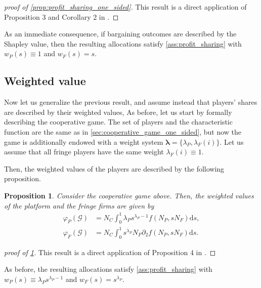 \documentclass[a4paper]{article}
\newtheorem{proposition}{Proposition}
\newcommand{\ds}{\mathrm{d}s}
\begin{document}
\begin{proof}[proof of \cref{prop:profit_sharing_one_sided}]
    This result is a direct application of Proposition 3 and Corollary 2 in \textcite{stancsics2023value}.
\end{proof}

As an immediate consequence, if bargaining outcomes are described by the Shapley value, then the resulting allocations satisfy \cref{ass:profit_sharing} with $w_P(s) \equiv 1$ and $w_F(s) = s$.


\subsection{Weighted value}
\label{sec:cooperative_game_weighted}

Now let us generalize the previous result, and assume instead that players' shares are described by their weighted values,
As before, let us start by formally describing the cooperative game.
The set of players and the characteristic function are the same as in \cref{sec:cooperative_game_one_sided}, but now the game is additionally endowed with a weight system $\mathbf{\lambda} = \{\lambda_P, \lambda_{F}(i)\}$.
Let us assume that all fringe players have the same weight $\lambda_{F}(i) \equiv 1$.

Then, the weighted values of the players are described by the following proposition.

\begin{proposition}
    \label{prop:profit_sharing_weighted}
    Consider the cooperative game above.
    Then, the weighted values of the platform and the fringe firms are given by
    \begin{align*}
        \varphi_P(\mathcal{G}) &= N_C \int_0^1 \lambda_P s ^ {\lambda_P - 1} f(N_P, s N_F) \ds, \\
        \varphi_F(\mathcal{G}) &= N_C \int_0^1 s ^ {\lambda_P} N_F \partial_2 f(N_P, s N_F) \ds.
    \end{align*}
\end{proposition}

\begin{proof}[proof of \cref{prop:profit_sharing_weighted}]
    This result is a direct application of Proposition 4 in \textcite{stancsics2023value}.
\end{proof}

As before, the resulting allocations satisfy \cref{ass:profit_sharing} with $w_P(s) \equiv \lambda_P s ^ {\lambda_P - 1}$ and $w_F(s) = s ^ {\lambda_P}$.
\end{document}
